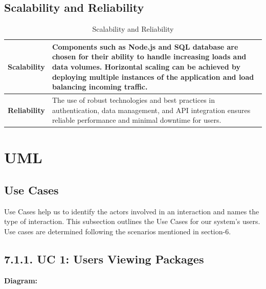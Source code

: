 \documentclass{scrreprt}
\begin{document}
    
    \begin{table}[ht]
    \section{Scalability and Reliability}
    \centering
    \caption{Scalability and Reliability}
    \begin{tabular}{|p{4cm}|p{10cm}|}
    \hline
    \textbf{Scalability} & Components such as Node.js and SQL database are chosen for their ability to handle increasing loads and data volumes. Horizontal scaling can be achieved by deploying multiple instances of the application and load balancing incoming traffic. \\
    \hline
    \textbf{Reliability} & The use of robust technologies and best practices in authentication, data management, and API integration ensures reliable performance and minimal downtime for users. \\
    \hline
    \end{tabular}
    \end{table}

\chapter{UML}

\section{Use Cases}
Use Cases help us to identify the actors involved in an interaction and names the type of interaction.
This subsection outlines the Use Cases for our system’s users. Use cases are determined following
the scenarios mentioned in section-6.

\section*{\textbf{7.1.1. UC 1: Users Viewing Packages}}
\textbf{Diagram:}
\newline
\newline
\begin{center}
    \parbox{0.8\textwidth}{ 
        \centering
    }
\end{center}
\end{document}
